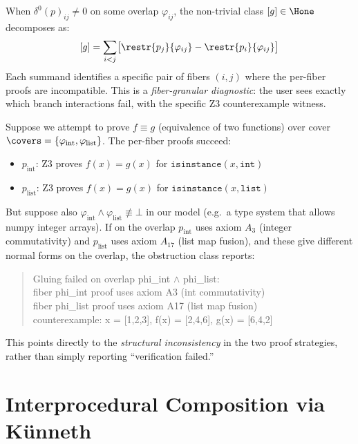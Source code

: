 \begin{proposition}
\label{prop:obstruction-diagnostic}
When $\delta^0(p)_{ij} \ne 0$ on some overlap $\varphi_{ij}$, the
non-trivial class $[g] \in \Hone$ decomposes as:
\[
  [g] = \sum_{i < j}
  \bigl[\restr{p_j}{\varphi_{ij}} - \restr{p_i}{\varphi_{ij}}\bigr]
\]
Each summand identifies a specific pair of fibers $(i,j)$ where the
per-fiber proofs are incompatible.  This is a \emph{fiber-granular
diagnostic}: the user sees exactly which branch interactions fail, with
the specific Z3 counterexample witness.
\end{proposition}

\begin{example}
\label{ex:obstruction-diagnostic}
Suppose we attempt to prove $f \equiv g$ (equivalence of two functions)
over cover $\covers = \{\varphi_{\mathrm{int}}, \varphi_{\mathrm{list}}\}$.
The per-fiber proofs succeed:
\begin{itemize}
\item $p_{\mathrm{int}}$: Z3 proves $f(x) = g(x)$ for $\mathtt{isinstance}(x,\mathtt{int})$
\item $p_{\mathrm{list}}$: Z3 proves $f(x) = g(x)$ for $\mathtt{isinstance}(x,\mathtt{list})$
\end{itemize}
But suppose also $\varphi_{\mathrm{int}} \wedge \varphi_{\mathrm{list}} \not\equiv \bot$
in our model (e.g.\ a type system that allows numpy integer arrays).
If on the overlap $p_{\mathrm{int}}$ uses axiom $A_3$ (integer commutativity)
and $p_{\mathrm{list}}$ uses axiom $A_{17}$ (list map fusion), and these
give different normal forms on the overlap, the obstruction class reports:
\begin{quote}\ttfamily
Gluing failed on overlap phi\_int $\wedge$ phi\_list:\\
  fiber phi\_int proof uses axiom A3 (int commutativity)\\
  fiber phi\_list proof uses axiom A17 (list map fusion)\\
  counterexample: x = [1,2,3], f(x) = [2,4,6], g(x) = [6,4,2]
\end{quote}
This points directly to the \emph{structural inconsistency} in the two
proof strategies, rather than simply reporting ``verification failed.''
\end{example}


\section{Interprocedural Composition via K\"{u}nneth}
\label{sec:kunneth}

